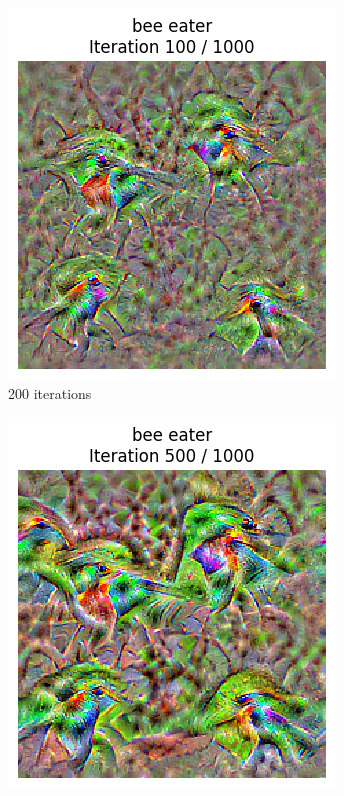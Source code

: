 \begin{figure}[H]
    \centering
    \begin{subfigure}[t]{.25\textwidth}
        \centering
        \includegraphics[width=\linewidth]{SqueezeNet/SqueezeNet_bird_animated_1000_regpp_blur_100_frame.png}
        \caption{200 iterations}
        \label{fig:class_viz_iter:sub1}
    \end{subfigure}%
    \begin{subfigure}[t]{.25\textwidth}
        \centering
        \includegraphics[width=\linewidth]{SqueezeNet/SqueezeNet_bird_animated_1000_regpp_blur_500_frame.png}

\end{subfigure}
\end{figure}
